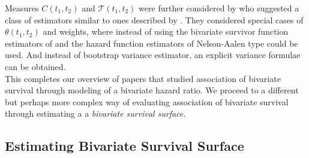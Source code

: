 \documentclass[]{article}
\begin{document}
Measures $C(t_1, t_2)$ and $\mathcal{T}(t_1, t_2)$ were further considered by
\cite{fan2000class} who suggested a class of estimators similar to ones described by \cite{fan2000dependence} . They considered special cases of $\theta(t_1, t_2)$ and weights, where instead of using the bivariate survivor function estimators of \cite{dabrowska1988kaplan} and \cite{prentice1992covariance} the hazard function estimators of Nelson-Aalen type could be used. And instead of bootstrap variance estimator, an explicit variance formulae can be obtained.\\
This completes our overview of papers that studied association of bivariate survival through modeling of a bivariate hazard ratio. We proceed to a different but perhaps more complex way of evaluating association of bivariate survival through estimating a a \emph{bivariate survival surface}.

\subsection{Estimating Bivariate Survival Surface}
\end{document}
